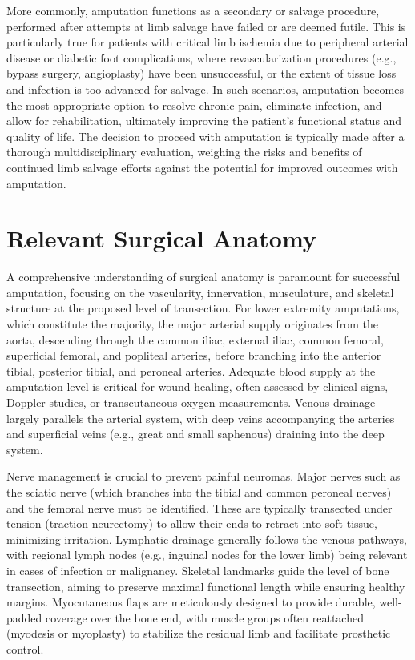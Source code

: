 More commonly, amputation functions as a secondary or salvage procedure, performed after attempts at limb salvage have failed or are deemed futile. This is particularly true for patients with critical limb ischemia due to peripheral arterial disease or diabetic foot complications, where revascularization procedures (e.g., bypass surgery, angioplasty) have been unsuccessful, or the extent of tissue loss and infection is too advanced for salvage. In such scenarios, amputation becomes the most appropriate option to resolve chronic pain, eliminate infection, and allow for rehabilitation, ultimately improving the patient's functional status and quality of life. The decision to proceed with amputation is typically made after a thorough multidisciplinary evaluation, weighing the risks and benefits of continued limb salvage efforts against the potential for improved outcomes with amputation.

\section*{Relevant Surgical Anatomy}
A comprehensive understanding of surgical anatomy is paramount for successful amputation, focusing on the vascularity, innervation, musculature, and skeletal structure at the proposed level of transection. For lower extremity amputations, which constitute the majority, the major arterial supply originates from the aorta, descending through the common iliac, external iliac, common femoral, superficial femoral, and popliteal arteries, before branching into the anterior tibial, posterior tibial, and peroneal arteries. Adequate blood supply at the amputation level is critical for wound healing, often assessed by clinical signs, Doppler studies, or transcutaneous oxygen measurements. Venous drainage largely parallels the arterial system, with deep veins accompanying the arteries and superficial veins (e.g., great and small saphenous) draining into the deep system.

Nerve management is crucial to prevent painful neuromas. Major nerves such as the sciatic nerve (which branches into the tibial and common peroneal nerves) and the femoral nerve must be identified. These are typically transected under tension (traction neurectomy) to allow their ends to retract into soft tissue, minimizing irritation. Lymphatic drainage generally follows the venous pathways, with regional lymph nodes (e.g., inguinal nodes for the lower limb) being relevant in cases of infection or malignancy. Skeletal landmarks guide the level of bone transection, aiming to preserve maximal functional length while ensuring healthy margins. Myocutaneous flaps are meticulously designed to provide durable, well-padded coverage over the bone end, with muscle groups often reattached (myodesis or myoplasty) to stabilize the residual limb and facilitate prosthetic control.

